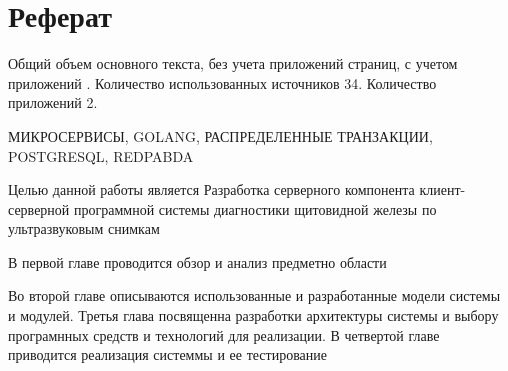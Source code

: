 \chapter*{Реферат}
\thispagestyle{plain}

Общий объем основного текста, без учета приложений \pageref{end_of_main_text} страниц, с учетом приложений \pageref{end_of_document}. Количество использованных источников 34.
Количество приложений 2.

\noindent \uppercase{микросервисы, golang, распределенные транзакции, postgresql, redpabda}

Целью данной работы является Разработка серверного компонента клиент-серверной
программной системы диагностики щитовидной железы по
ультразвуковым снимкам

В первой главе проводится обзор и анализ предметно области

Во второй главе описываются использованные и разработанные модели системы и модулей. 
Третья глава посвященна разработки архитектуры системы и выбору програмнных средств и технологий для реализации.
В четвертой главе приводится реализация системмы и ее тестирование

